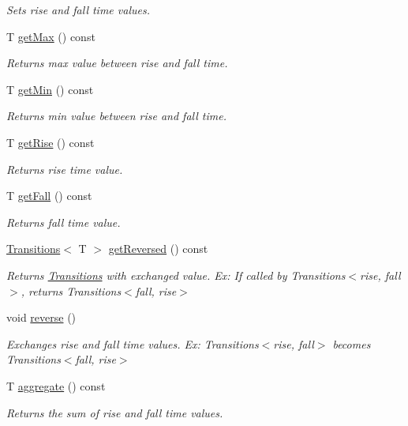 \begin{DoxyCompactItemize}
\begin{DoxyCompactList}\small\item\em Sets rise and fall time values. \end{DoxyCompactList}\item 
T \hyperlink{classTransitions_a59e47d34d366733da94f784c0177f8d9}{get\-Max} () const 
\begin{DoxyCompactList}\small\item\em Returns max value between rise and fall time. \end{DoxyCompactList}\item 
T \hyperlink{classTransitions_a37bb8749642ad21d22b264f39003d2ce}{get\-Min} () const 
\begin{DoxyCompactList}\small\item\em Returns min value between rise and fall time. \end{DoxyCompactList}\item 
T \hyperlink{classTransitions_ad88835ca81b7008ecfb7824bc5c17045}{get\-Rise} () const 
\begin{DoxyCompactList}\small\item\em Returns rise time value. \end{DoxyCompactList}\item 
T \hyperlink{classTransitions_affdb33e440b6ac3e6e685d83d46b3189}{get\-Fall} () const 
\begin{DoxyCompactList}\small\item\em Returns fall time value. \end{DoxyCompactList}\item 
\hyperlink{classTransitions}{Transitions}$<$ T $>$ \hyperlink{classTransitions_ac6e5a9efd02d3da3751fcaa845c7955b}{get\-Reversed} () const 
\begin{DoxyCompactList}\small\item\em Returns \hyperlink{classTransitions}{Transitions} with exchanged value. Ex\-: If called by Transitions$<$rise, fall$>$, returns Transitions$<$fall, rise$>$ \end{DoxyCompactList}\item 
void \hyperlink{classTransitions_ae547df9c8b8d6191aa95ca8f3e850605}{reverse} ()
\begin{DoxyCompactList}\small\item\em Exchanges rise and fall time values. Ex\-: Transitions$<$rise, fall$>$ becomes Transitions$<$fall, rise$>$ \end{DoxyCompactList}\item 
T \hyperlink{classTransitions_ab89e328a131f4ccf8882c67a30d6726c}{aggregate} () const 
\begin{DoxyCompactList}\small\item\em Returns the sum of rise and fall time values. \end{DoxyCompactList}\end{DoxyCompactItemize}
